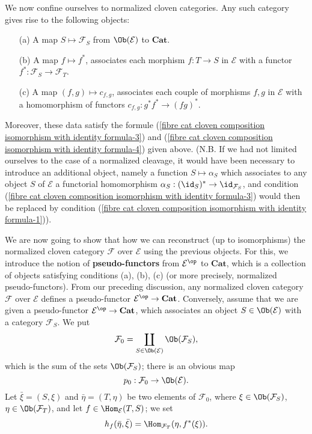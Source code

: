 We now confine ourselves to normalized cloven categories. Any such category gives rise to the following objects:
\begin{enumerate}
\item[(a)] A map $S\mapsto\mathcal{F}_S$ from $\Ob(\mathcal{E})$ to $\mathbf{Cat}$.
\item[(b)] A map $f\mapsto f^*$, associates each morphism $f:T\to S$ in $\mathcal{E}$ with a functor $f^*:\mathcal{F}_S\to \mathcal{F}_T$.
\item[(c)] A map $(f,g)\mapsto c_{f,g}$, associates each couple of morphisms $f,g$ in $\mathcal{E}$ with a homomorphism of functors $c_{f,g}:g^*f^*\to (fg)^*$.
\end{enumerate}
Moreover, these data satisfy the formule (\ref{fibre cat cloven composition isomorphism with identity formula-3}) and (\ref{fibre cat cloven composition isomorphism with identity formula-4}) given above. (N.B. If we had not limited ourselves to the case of a normalized cleavage, it would have been necessary to introduce an additional object, namely a function $S\mapsto\alpha_S$ which associates to any object $S$ of $\mathcal{E}$ a functorial homomorphism $\alpha_S:(\id_S)^*\to \id_{\mathcal{F}_S}$, and condition (\ref{fibre cat cloven composition isomorphism with identity formula-3}) would then be replaced by condition (\ref{fibre cat cloven composition isomorphism with identity formula-1})).\par
We are now going to show that how we can reconstruct (up to isomorphisms) the normalized cloven category $\mathcal{F}$ over $\mathcal{E}$ using the previous objects. For this, we introduce the notion of \textbf{pseudo-functors} from $\mathcal{E}^{\op}$ to $\mathbf{Cat}$, which is a collection of objects satisfying conditions (a), (b), (c) (or more precisely, normalized pseudo-functors). From our preceding discussion, any normalized cloven category $\mathcal{F}$ over $\mathcal{E}$ defines a pseudo-functor $\mathcal{E}^{\op}\to \mathbf{Cat}$. Conversely, assume that we are given a pseudo-functor $\mathcal{E}^{\op}\to \mathbf{Cat}$, which associates an object $S\in\Ob(\mathcal{E})$ with a category $\mathcal{F}_S$. We put
\[\mathcal{F}_0=\coprod_{S\in\Ob(\mathcal{E})}\Ob(\mathcal{F}_S),\]
which is the sum of the sets $\Ob(\mathcal{F}_S)$; there is an obvious map
\[p_0:\mathcal{F}_0\to \Ob(\mathcal{E}).\]
Let $\bar{\xi}=(S,\xi)$ and $\bar{\eta}=(T,\eta)$ be two elements of $\mathcal{F}_0$, where $\xi\in\Ob(\mathcal{F}_S)$, $\eta\in\Ob(\mathcal{F}_T)$, and let $f\in\Hom_\mathcal{E}(T,S)$; we set
\[h_f(\bar{\eta},\bar{\xi})=\Hom_{\mathcal{F}_T}(\eta,f^*(\xi)).\]

